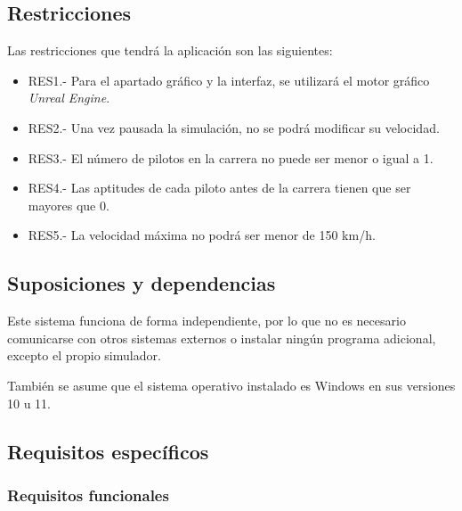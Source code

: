 \subsection{Restricciones}

Las restricciones que tendrá la aplicación son las siguientes:

\begin{itemize}
    \item RES1.- Para el apartado gráfico y la interfaz, se utilizará el motor gráfico \textit{Unreal Engine}.
    \item RES2.- Una vez pausada la simulación, no se podrá modificar su velocidad.
    \item RES3.- El número de pilotos en la carrera no puede ser menor o igual a 1.
    \item RES4.- Las aptitudes de cada piloto antes de la carrera tienen que ser mayores que 0.
    \item RES5.- La velocidad máxima no podrá ser menor de 150 km/h.
\end{itemize}

\subsection{Suposiciones y dependencias}



Este sistema funciona de forma independiente, por lo que no es necesario comunicarse con otros sistemas externos o instalar ningún programa adicional, excepto el propio simulador.

\bigskip

También se asume que el sistema operativo instalado es Windows en sus versiones 10 u 11.

\subsection{Requisitos específicos}

\subsubsection{Requisitos funcionales}

